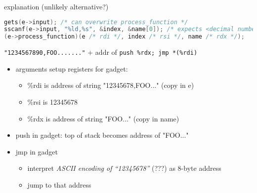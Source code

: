 \begin{soln}
\begin{frame}[fragile,label=useFPtrOverwrite2Explain]{explanation (unlikely alternative?)}
\begin{lstlisting}[language=C++,style=script]
gets(e->input); /* can overwrite process_function */
sscanf(e->input, "%ld,%s", &index, &name[0]); /* expects <decimal number>,<string> */
(e->process_function)(e /* rdi */, index /* rsi */, name /* rdx */);
\end{lstlisting}
\texttt{"1234567890,FOO......."} + addr of \texttt{push \%rdx; jmp *(\%rdi)}
\begin{itemize}
\item arguments setup registers for gadget:
\begin{itemize}
    \item \%rdi is address of string "12345678,FOO..." (copy in e)
    \item \%rsi is 12345678
    \item \%rdx is address of string "FOO..." (copy in name)
\end{itemize}
\item push in gadget: top of stack becomes address of "FOO..."
\item jmp in gadget
    \begin{itemize}
    \item interpret \textit{ASCII encoding of ``12345678''} (???) as 8-byte address
    \item jump to that address
    \end{itemize}
\end{itemize}
\end{frame}
\end{soln}
